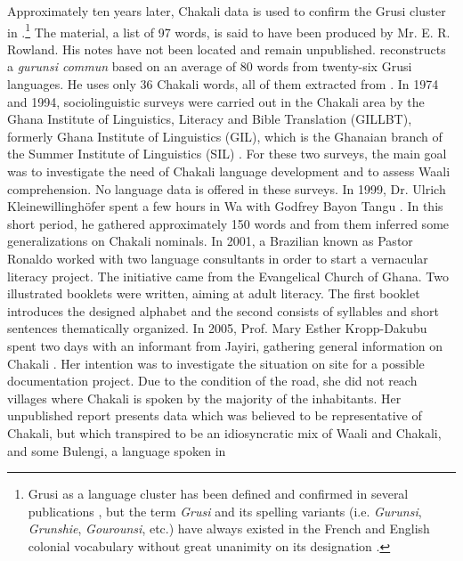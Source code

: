 Approximately ten years later, Chakali data is used to confirm the 
Grusi 
cluster in \citet{Bend65}.\footnote{Grusi  as a language cluster 
has been defined and confirmed in several publications \citep{Dela12, Kohl58, 
Bend65, Mane69a, Mane69b, Klei97}, but  the term  {\it {}Grusi} and its 
spelling variants (i.e. {\it Gurunsi}, {\it Grunshie}, {\it Gourounsi}, etc.)  
have always existed in the French and English colonial vocabulary without great 
unanimity on its designation \citep{Taux21, Taux24, Ratt32a, Ratt32b, Nico52, 
Dupe84}. }  The material, a list of 97 words, is said to have been produced by  
Mr. E. R. Rowland.  His notes have not been located and remain unpublished.  
\citet{Mane69a, Mane69b} reconstructs  a {\it  gurunsi commun}  based on an 
average of 80 words from twenty-six Grusi languages.  He uses  
only 36 Chakali words, all of them extracted from \citet{Bend65}. In 
1974 and 1994, sociolinguistic surveys were carried out in the Chakali area by 
the Ghana Institute of Linguistics, Literacy and Bible Translation (GILLBT), 
formerly Ghana Institute of Linguistics (GIL), which is the Ghanaian branch of 
the Summer Institute of Linguistics (SIL) \citep{Reim75, Tomp02}. For these two 
surveys, the main goal  was to investigate the need of Chakali language 
development and to assess  Waali comprehension. No language data is offered in 
these surveys. In 1999, Dr. Ulrich Kleinewillinghöfer spent a few hours in Wa 
with Godfrey Bayon Tangu \citep{Klei99}. In this short period,  he  gathered 
approximately 150 words  and from them  inferred some generalizations on Chakali 
nominals. In 2001, a Brazilian  known as Pastor Ronaldo worked with two  
language consultants in order to start a vernacular literacy project. The 
initiative came from the Evangelical Church of Ghana.  Two illustrated booklets 
were written,  aiming at adult literacy.  The first 
booklet introduces the designed alphabet  and the second  
consists of  syllables and short sentences thematically organized. In 2005, 
Prof. Mary Esther Kropp-Dakubu spent two  days with an informant from Jayiri, 
gathering general information on Chakali  \citep{Daku05}. Her intention was to 
investigate the situation on site for a possible documentation project. Due to 
the 
condition of the road, she did not reach villages where Chakali is spoken by the 
majority of the inhabitants.  Her unpublished report  presents  data which was 
believed to be representative of  Chakali, but which transpired to be an 
idiosyncratic mix of Waali and Chakali, and some Bulengi,  a language spoken in 
